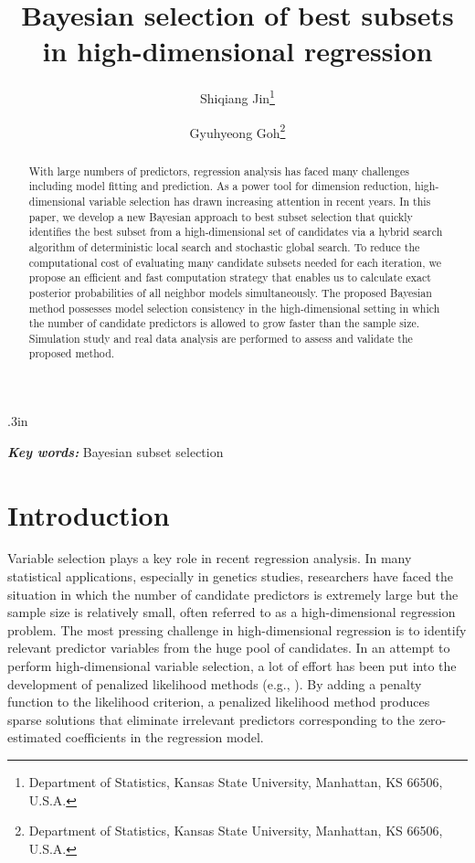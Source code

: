 \documentclass[12pt]{article}
\title{\LARGE\bf Bayesian selection of best subsets in high-dimensional regression}
\author{ Shiqiang Jin\thanks{Department of Statistics, Kansas State University, Manhattan, KS 66506, U.S.A.} \and Gyuhyeong Goh\thanks{Department of Statistics, Kansas State University, Manhattan, KS 66506, U.S.A.} }
\providecommand{\keywords}[1]{\textbf{\textit{Key words:}} #1}
\begin{document}
\baselineskip .3in
\maketitle

\begin{abstract}
 With large numbers of predictors, regression analysis has faced many challenges including model fitting and prediction. As a power tool for dimension reduction, high-dimensional variable selection has drawn increasing attention in recent years. In this paper, we develop a new Bayesian approach to best subset selection that quickly identifies the best subset from a high-dimensional set of candidates via a hybrid search algorithm of deterministic local search and stochastic global search. To reduce the computational cost of evaluating many candidate subsets needed for each iteration, we propose an efficient and fast computation strategy that enables us to calculate exact posterior probabilities of all neighbor models simultaneously. The proposed Bayesian method possesses model selection consistency in the high-dimensional setting in which the number of candidate predictors is allowed to grow faster than the sample size. Simulation study and real data analysis are performed to assess and validate the proposed method.
\end{abstract}

\keywords{Bayesian subset selection}

\section{Introduction}
Variable selection plays a key role in recent regression analysis. In many statistical applications, especially in genetics studies, researchers have faced the situation in which the number of candidate predictors is extremely large but the sample size is relatively small, often referred to as a high-dimensional regression problem. The most pressing challenge in high-dimensional regression is to identify relevant predictor variables from the huge pool of candidates. In an attempt to perform high-dimensional variable selection, a lot of effort has been put into the development of penalized likelihood methods (e.g., \citealt{tibshirani1996regression, fan2001variable, zou2005regularization, zhang2010nearly}). By adding a penalty function to the likelihood criterion, a penalized likelihood method produces sparse solutions that eliminate irrelevant predictors corresponding to the zero-estimated coefficients in the regression model.
\end{document}
